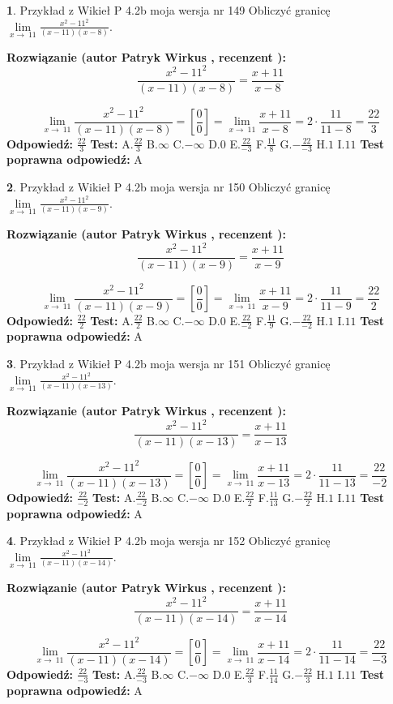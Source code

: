 \documentclass[12pt, a4paper]{article}
\theoremstyle{definition} %
\newtheorem{zad}{}
\newcommand{\zadStart}[1]{\begin{zad}#1\newline}
\newcommand{\zadStop}{\end{zad}}
\newcommand{\rozwStart}[2]{\noindent \textbf{Rozwiązanie (autor #1 , recenzent #2): }\newline}
\newcommand{\rozwStop}{\newline}
\newcommand{\odpStart}{\noindent \textbf{Odpowiedź:}\newline}
\newcommand{\odpStop}{\newline}
\newcommand{\testStart}{\noindent \textbf{Test:}\newline}
\newcommand{\testStop}{\newline}
\newcommand{\kluczStart}{\noindent \textbf{Test poprawna odpowiedź:}\newline}
\newcommand{\kluczStop}{\newline}
\begin{document}
\zadStart{Przykład z Wikieł P 4.2b moja wersja nr 149}
Obliczyć granicę $\lim\limits_{x\to\ 11}\frac{x^{2}-11^{2}}{(x-11)(x-8)}$.
\zadStop
\rozwStart{Patryk Wirkus}{}
$$\frac{x^{2}-11^{2}}{(x-11)(x-8)}=\frac{x+11}{x-8}$$

$$\lim\limits_{x\to\ 11}\frac{x^{2}-11^{2}}{(x-11)(x-8)}=[\frac{0}{0}]=\lim\limits_{x\to\ 11}\frac{x+11}{x-8}=2 \cdot \frac{11}{11-8} = \frac{22}{3}$$
\rozwStop
\odpStart
$\frac{22}{3}$
\odpStop
\testStart
A.$\frac{22}{3}$
B.$\infty$
C.$-\infty$
D.$0$
E.$\frac{22}{-3}$
F.$\frac{11}{8}$
G.$-\frac{22}{-3}$
H.$1$
I.$11$
\testStop
\kluczStart
A
\kluczStop



\zadStart{Przykład z Wikieł P 4.2b moja wersja nr 150}
Obliczyć granicę $\lim\limits_{x\to\ 11}\frac{x^{2}-11^{2}}{(x-11)(x-9)}$.
\zadStop
\rozwStart{Patryk Wirkus}{}
$$\frac{x^{2}-11^{2}}{(x-11)(x-9)}=\frac{x+11}{x-9}$$

$$\lim\limits_{x\to\ 11}\frac{x^{2}-11^{2}}{(x-11)(x-9)}=[\frac{0}{0}]=\lim\limits_{x\to\ 11}\frac{x+11}{x-9}=2 \cdot \frac{11}{11-9} = \frac{22}{2}$$
\rozwStop
\odpStart
$\frac{22}{2}$
\odpStop
\testStart
A.$\frac{22}{2}$
B.$\infty$
C.$-\infty$
D.$0$
E.$\frac{22}{-2}$
F.$\frac{11}{9}$
G.$-\frac{22}{-2}$
H.$1$
I.$11$
\testStop
\kluczStart
A
\kluczStop



\zadStart{Przykład z Wikieł P 4.2b moja wersja nr 151}
Obliczyć granicę $\lim\limits_{x\to\ 11}\frac{x^{2}-11^{2}}{(x-11)(x-13)}$.
\zadStop
\rozwStart{Patryk Wirkus}{}
$$\frac{x^{2}-11^{2}}{(x-11)(x-13)}=\frac{x+11}{x-13}$$

$$\lim\limits_{x\to\ 11}\frac{x^{2}-11^{2}}{(x-11)(x-13)}=[\frac{0}{0}]=\lim\limits_{x\to\ 11}\frac{x+11}{x-13}=2 \cdot \frac{11}{11-13} = \frac{22}{-2}$$
\rozwStop
\odpStart
$\frac{22}{-2}$
\odpStop
\testStart
A.$\frac{22}{-2}$
B.$\infty$
C.$-\infty$
D.$0$
E.$\frac{22}{2}$
F.$\frac{11}{13}$
G.$-\frac{22}{2}$
H.$1$
I.$11$
\testStop
\kluczStart
A
\kluczStop



\zadStart{Przykład z Wikieł P 4.2b moja wersja nr 152}
Obliczyć granicę $\lim\limits_{x\to\ 11}\frac{x^{2}-11^{2}}{(x-11)(x-14)}$.
\zadStop
\rozwStart{Patryk Wirkus}{}
$$\frac{x^{2}-11^{2}}{(x-11)(x-14)}=\frac{x+11}{x-14}$$

$$\lim\limits_{x\to\ 11}\frac{x^{2}-11^{2}}{(x-11)(x-14)}=[\frac{0}{0}]=\lim\limits_{x\to\ 11}\frac{x+11}{x-14}=2 \cdot \frac{11}{11-14} = \frac{22}{-3}$$
\rozwStop
\odpStart
$\frac{22}{-3}$
\odpStop
\testStart
A.$\frac{22}{-3}$
B.$\infty$
C.$-\infty$
D.$0$
E.$\frac{22}{3}$
F.$\frac{11}{14}$
G.$-\frac{22}{3}$
H.$1$
I.$11$
\testStop
\kluczStart
A
\kluczStop
\end{document}
